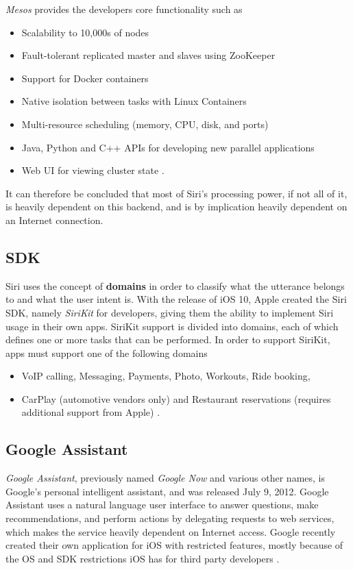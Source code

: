 \documentclass[preprint,12pt]{elsarticle}
\begin{document}
\textit{Mesos} provides the developers core functionality such as

\begin{itemize}
    \item Scalability to 10,000s of nodes
    \item Fault-tolerant replicated master and slaves using ZooKeeper
    \item Support for Docker containers
    \item Native isolation between tasks with Linux Containers
    \item Multi-resource scheduling (memory, CPU, disk, and ports)
    \item Java, Python and C++ APIs for developing new parallel applications
    \item Web UI for viewing cluster state \cite{mesos2016}.
\end{itemize}


It can therefore be concluded that most of Siri's processing power, if not all of it, is heavily dependent on this backend, and is by implication heavily dependent on an Internet connection.

\subsection{SDK}
Siri uses the concept of \textbf{domains} in order to classify what the utterance belongs to and what the user intent is. 
With the release of iOS 10, Apple created the Siri SDK, namely \textit{SiriKit} for developers, giving them the ability to implement Siri usage in their own apps.
SiriKit support is divided into domains, each of which defines one or more tasks that can be performed. In order to support SiriKit, apps must support one of the following domains

\begin{itemize}
    \item VoIP calling, Messaging, Payments, Photo, Workouts, Ride booking, 
    \item CarPlay (automotive vendors only) and Restaurant reservations (requires additional support from Apple) \cite{sirikit2016}.
\end{itemize}




\subsection{Google Assistant}
\textit{Google Assistant}, previously named  \textit{Google Now} and various other names, is Google's personal intelligent assistant, and was released July 9, 2012. Google Assistant uses a natural language user interface to answer questions, make recommendations, and perform actions by delegating requests to web services, which makes the service heavily dependent on Internet access. Google recently created their own application for iOS with restricted features, mostly because of the OS and SDK restrictions iOS has for third party developers \cite{googlenow2016}.
\end{document}
